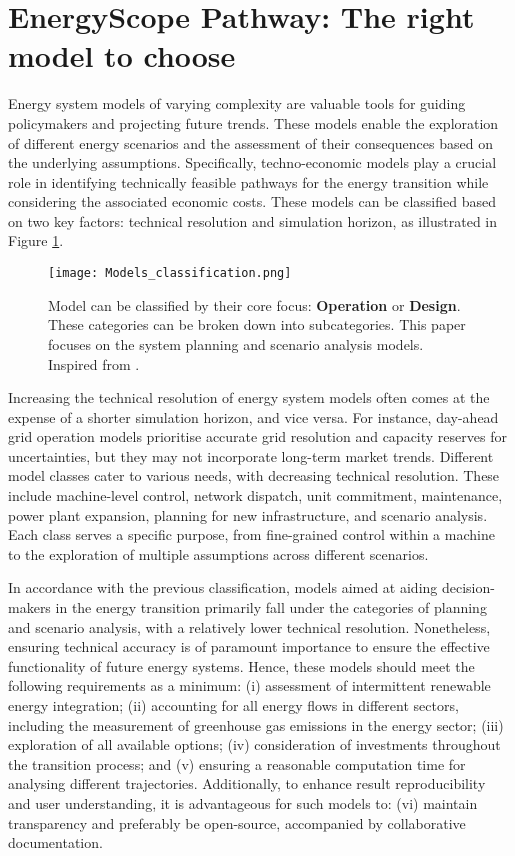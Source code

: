 \section{EnergyScope Pathway: The right model to choose} 
\label{app:ESPathway_choice}

Energy system models of varying complexity are valuable tools for guiding policymakers and projecting future trends. These models enable the exploration of different energy scenarios and the assessment of their consequences based on the underlying assumptions. Specifically, techno-economic models play a crucial role in identifying technically feasible pathways for the energy transition while considering the associated economic costs. These models can be classified based on two key factors: technical resolution and simulation horizon, as illustrated in Figure \ref{fig:energy_models_classification}.


\begin{figure}[!htbp]
\centering
\texttt{[image: Models\_classification.png]}
\caption{Model can be classified by their core focus: \textbf{Operation} or \textbf{Design}. These categories can be broken down into subcategories. This paper focuses on the system planning and scenario analysis models. Inspired from \cite{palmintier2013incorporating}. }
\label{fig:energy_models_classification}
\end{figure}


Increasing the technical resolution of energy system models often comes at the expense of a shorter simulation horizon, and vice versa. For instance, day-ahead grid operation models prioritise accurate grid resolution and capacity reserves for uncertainties, but they may not incorporate long-term market trends. Different model classes cater to various needs, with decreasing technical resolution. These include machine-level control, network dispatch, unit commitment, maintenance, power plant expansion, planning for new infrastructure, and scenario analysis. Each class serves a specific purpose, from fine-grained control within a machine to the exploration of multiple assumptions across different scenarios.


In accordance with the previous classification, models aimed at aiding decision-makers in the energy transition primarily fall under the categories of planning and scenario analysis, with a relatively lower technical resolution. Nonetheless, ensuring technical accuracy is of paramount importance to ensure the effective functionality of future energy systems. Hence, these models should meet the following requirements as a minimum:
(i) assessment of intermittent renewable energy integration;
(ii) accounting for all energy flows in different sectors, including the measurement of greenhouse gas emissions in the energy sector;
(iii) exploration of all available options;
(iv) consideration of investments throughout the transition process; and
(v) ensuring a reasonable computation time for analysing different trajectories.
Additionally, to enhance result reproducibility and user understanding, it is advantageous for such models to:
(vi) maintain transparency and preferably be open-source, accompanied by collaborative documentation.


